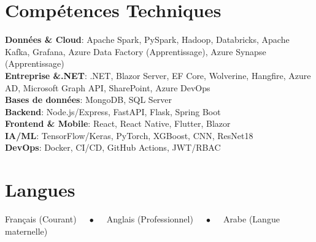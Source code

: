 \documentclass[letterpaper,11pt]{article}
\begin{document}
\section{Compétences Techniques}
 \begin{itemize}[leftmargin=0.15in, label={}]
    \small{\item{
     \textbf{Données \& Cloud}{: Apache Spark, PySpark, Hadoop, Databricks, Apache Kafka, Grafana, Azure Data Factory (Apprentissage), Azure Synapse (Apprentissage)} \\
     \textbf{Entreprise \&.NET}{: .NET, Blazor Server, EF Core, Wolverine, Hangfire, Azure AD, Microsoft Graph API, SharePoint, Azure DevOps} \\
     \textbf{Bases de données}{: MongoDB, SQL Server} \\
     \textbf{Backend}{: Node.js/Express, FastAPI, Flask, Spring Boot} \\
     \textbf{Frontend \& Mobile}{: React, React Native, Flutter, Blazor} \\
     \textbf{IA/ML}{: TensorFlow/Keras, PyTorch, XGBoost, CNN, ResNet18} \\
     \textbf{DevOps}{: Docker, CI/CD, GitHub Actions, JWT/RBAC}
    }}
 \end{itemize}

\section{Langues}
 \begin{itemize}[leftmargin=0.15in, label={}]
    \small{\item{
     Français (Courant) $\quad\bullet\quad$ Anglais (Professionnel) $\quad\bullet\quad$ Arabe (Langue maternelle)
    }}
 \end{itemize}
\end{document}
